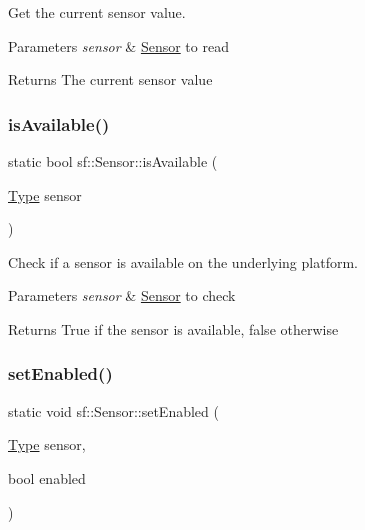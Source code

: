 Get the current sensor value. 


\begin{DoxyParams}{Parameters}
{\em sensor} & \hyperlink{classsf_1_1_sensor}{Sensor} to read\\
\hline
\end{DoxyParams}
\begin{DoxyReturn}{Returns}
The current sensor value 
\end{DoxyReturn}
\mbox{\label{classsf_1_1_sensor_a7b7a2570218221781233bd495323abf0}} 
\subsubsection{\texorpdfstring{is\+Available()}{isAvailable()}}
{\footnotesize\ttfamily static bool sf\+::\+Sensor\+::is\+Available (\begin{DoxyParamCaption}\item[{\hyperlink{classsf_1_1_sensor_a687375af3ab77b818fca73735bcaea84}{Type}}]{sensor }\end{DoxyParamCaption})\hspace{0.3cm}{\ttfamily [static]}}



Check if a sensor is available on the underlying platform. 


\begin{DoxyParams}{Parameters}
{\em sensor} & \hyperlink{classsf_1_1_sensor}{Sensor} to check\\
\hline
\end{DoxyParams}
\begin{DoxyReturn}{Returns}
True if the sensor is available, false otherwise 
\end{DoxyReturn}
\mbox{\label{classsf_1_1_sensor_afb31c5697d2e0a5fec70d702ec1d6cd9}} 
\subsubsection{\texorpdfstring{set\+Enabled()}{setEnabled()}}
{\footnotesize\ttfamily static void sf\+::\+Sensor\+::set\+Enabled (\begin{DoxyParamCaption}\item[{\hyperlink{classsf_1_1_sensor_a687375af3ab77b818fca73735bcaea84}{Type}}]{sensor,  }\item[{bool}]{enabled }\end{DoxyParamCaption})\hspace{0.3cm}{\ttfamily [static]}}



